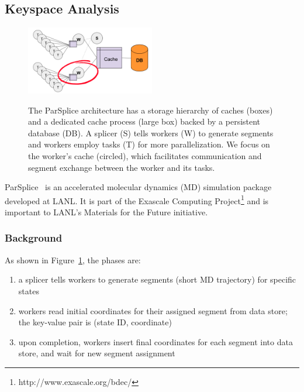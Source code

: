 \subsection{Keyspace Analysis}
\label{sec:parsplice-keyspace-analysis}

\begin{figure}[t]
\centering
\noindent\includegraphics[width=0.5\textwidth]{./chapters/controlplane/parsplice/figures/parsplice.png}\\
\caption{The ParSplice architecture has a storage hierarchy of caches (boxes) and a
dedicated cache process (large box) backed by a persistent database (DB). A splicer
(S) tells workers (W) to generate segments and workers employ tasks (T) for more
parallelization. We focus on the worker's cache (circled), which facilitates
communication and segment exchange between the worker and its tasks.
\label{fig:parsplice}}
\end{figure}

ParSplice~\cite{perez:jctc20150parsplice} is an accelerated molecular dynamics
(MD) simulation package developed at LANL. It is part of the Exascale Computing
Project\footnote{http://www.exascale.org/bdec/} and is important to LANL's
Materials for the Future initiative. 

\subsubsection{Background}

As shown in Figure~\ref{fig:parsplice}, the phases are:

\begin{enumerate}

  \item a splicer tells workers to generate segments (short MD trajectory) for
  specific states

  \item workers read initial coordinates for their assigned segment from data
  store; the key-value pair is (state ID, coordinate)

  \item upon completion, workers insert final coordinates for each segment into
  data store, and wait for new segment assignment

\end{enumerate}

